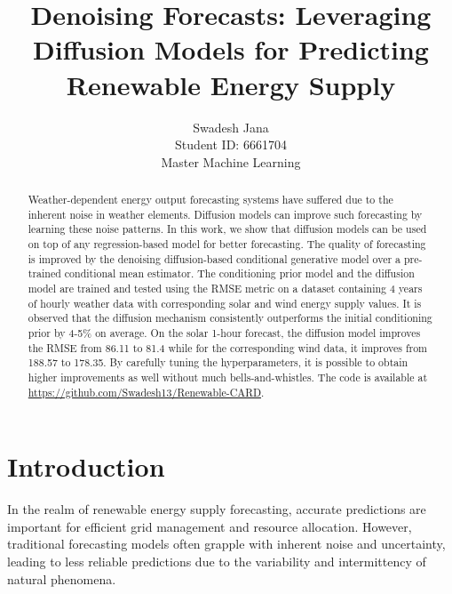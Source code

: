 \documentclass{article}
\title{Denoising Forecasts: Leveraging Diffusion Models for Predicting Renewable Energy Supply}
\author{Swadesh Jana \\
Student ID: 6661704 \\
Master Machine Learning}
\begin{document}
\maketitle

\begin{abstract}
Weather-dependent energy output forecasting systems have suffered due to the inherent noise in weather elements. Diffusion models can improve such forecasting by learning these noise patterns. In this work, we show that diffusion models can be used on top of any regression-based model for better forecasting. The quality of forecasting is improved by the denoising
diffusion-based conditional generative model over a pre-trained conditional mean
estimator. The conditioning prior model and the diffusion model are trained and tested using the RMSE metric on a dataset containing 4 years of hourly weather data with corresponding solar and wind energy supply values. It is observed that the diffusion mechanism consistently outperforms the initial conditioning prior by 4-5\% on average. On the solar 1-hour forecast, the diffusion model improves the RMSE from 86.11 to 81.4 while for the corresponding wind data, it improves from 188.57 to 178.35. By carefully tuning the hyperparameters, it is possible to obtain higher improvements as well without much bells-and-whistles. The code is available at \url{https://github.com/Swadesh13/Renewable-CARD}.
\end{abstract}

\section{Introduction}

In the realm of renewable energy supply forecasting, accurate predictions are important for efficient grid management and resource allocation. However, traditional forecasting models often grapple with inherent noise and uncertainty, leading to less reliable predictions due to the variability and intermittency of natural phenomena.
\end{document}
